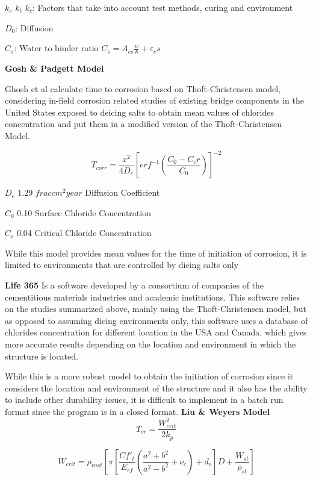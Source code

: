 $k_e$ $k_t$ $k_c$: Factors that take into account test methods, curing and environment

$D_0$: Diffusion

$C_s$: Water to binder ratio $C_s=A_{cs}\frac{w}{b}+\varepsilon_cs$


\textbf{Gosh \& Padgett Model}


Ghosh et al calculate time to corrosion based on Thoft-Christensen model, considering in-field corrosion related studies of existing bridge components in the United States exposed to deicing salts to obtain mean values of chlorides concentration and put them in a modified version of the Thoft-Christensen Model.

\begin{equation}
T_{corr}=\frac{x^2}{4 D_c} \left[erf^{-1} \left(\frac{C_0-C_cr}{C_0} \right) \right]^{-2}
  \label{eq.ten}
\end{equation} 

$D_c$ 1.29 $frac{cm^2}{year}$ Diffusion Coefficient 

$C_0$ 0.10 Surface Chloride Concentration

$C_r$ 0.04 Critical Chloride Concentration

While this model provides mean values for the time of initiation of corrosion, it is limited to environments that are controlled by dicing salts only

\:
 
\textbf{Life 365}
\:
Is a software developed by a consortium of companies of the cementitious materials industries and academic institutions. This software relies on the studies summarized above, mainly using the Thoft-Christensen model, but as opposed to assuming dicing environments only, this software uses a database of chlorides concentration for different location in the USA and Canada, which gives more accurate results depending on the location and environment in which the structure is located.

While this is a more robust model to obtain the initiation of corrosion since it considers the location and environment of the structure and it also has the ability to include other durability issues, it is difficult to implement in a batch run format since the program is in a closed format.
\:
\textbf{Liu \& Weyers Model}
\:
\begin{equation}
  T_{cr}=\frac{W_{crit}^2}{2k_p}
  \label{eq.two}
\end{equation} 

\begin{equation}
  W_{crit}=\rho_{rust} \left[ \pi \left[ \frac{C f'_t}{E_{ef}} \left( \frac{a^2+b^2}{a^2-b^2}+\nu_c \right)+d_o \right] D+ \frac{W_{st}}{\rho_{st}} \right]
  \label{eq.three}
\end{equation} 

